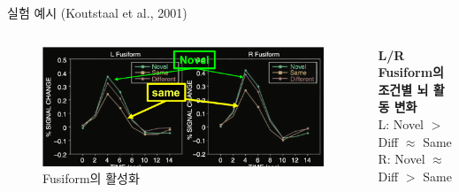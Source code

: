 \documentclass{beamer}
\begin{document}
\begin{frame}{실험 예시 (Koutstaal et al., 2001)}
\begin{columns}
\begin{column}{0.58\textwidth}
\begin{columns}
\begin{column}{0.6\textwidth}
\begin{figure}
            \centering
            \includegraphics[width=\textwidth]{image/Koutstaal_graph}
            \caption{Fusiform의 활성화}
          \end{figure}
          \vspace{-1em}
        \end{column}
        \hspace{-0.2em}
        \begin{column}{0.4\textwidth}
          \textbf{L/R Fusiform의 조건별 뇌 활동 변화}\\
          {\small
          L: Novel $>$ Diff $\approx$ Same\\
          R: Novel $\approx$ Diff $>$ Same
          }
        \end{column}
      \end{columns}
    \end{column}
  \end{columns}
  \hfill
\end{frame}
\end{document}
